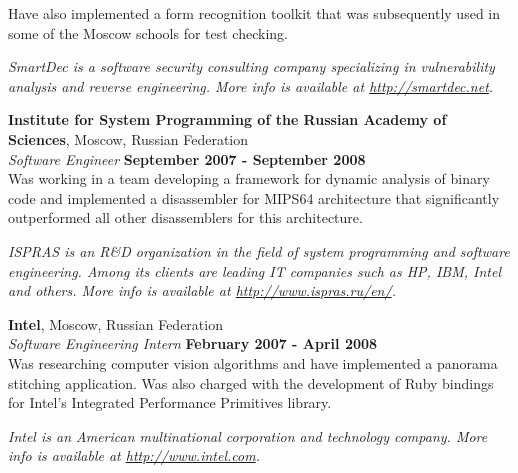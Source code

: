 \documentclass[margin,line]{CV}
\begin{document}
\begin{resume}
    Have also implemented a form recognition toolkit that was subsequently used in some of the Moscow schools for test checking. 


\ifdefined\superofficial
    {\footnotesize\textit{SmartDec is a software security consulting company specializing in vulnerability analysis and reverse engineering. More info is available at \url{http://smartdec.net}.}}
\fi
    
    
    \vspace{2mm}
    \textbf{Institute for System Programming of the Russian Academy of Sciences}, Moscow, Russian Federation\vspace{1mm}\\
    \textsl{Software Engineer} \hfill \textbf{September 2007 - September 2008}\vspace{1mm}\\
    Was working in a team developing a framework for dynamic analysis of binary code and implemented a disassembler for MIPS64 architecture that significantly outperformed all other disassemblers for this architecture.

\ifdefined\superofficial
    {\footnotesize\textit{ISPRAS is an R\&D organization in the field of system programming and software engineering. Among its clients are leading IT companies such as HP, IBM, Intel and others. More info is available at \url{http://www.ispras.ru/en/}.}}
\fi
    
    \pagebreak

    \vspace{2mm}
    \textbf{Intel}, Moscow, Russian Federation\vspace{1mm}\\
    \textsl{Software Engineering Intern} \hfill \textbf{February 2007 - April 2008}\vspace{1mm}\\
    Was researching computer vision algorithms and have implemented a panorama stitching application. Was also charged with the development of Ruby bindings for Intel's Integrated Performance Primitives library.
    
\ifdefined\superofficial
    {\footnotesize\textit{Intel is an American multinational corporation and technology company. More info is available at \url{http://www.intel.com}.}}
\fi
    

\end{resume}
\end{document}
